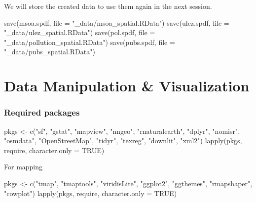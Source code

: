 \documentclass[
  letterpaper,
  DIV=11,
  numbers=noendperiod]{scrreprt}
\newenvironment{Shaded}{\begin{snugshade}}{\end{snugshade}}
\newcommand{\AttributeTok}[1]{\textcolor[rgb]{0.40,0.45,0.13}{#1}}
\newcommand{\ConstantTok}[1]{\textcolor[rgb]{0.56,0.35,0.01}{#1}}
\newcommand{\FunctionTok}[1]{\textcolor[rgb]{0.28,0.35,0.67}{#1}}
\newcommand{\NormalTok}[1]{\textcolor[rgb]{0.00,0.23,0.31}{#1}}
\newcommand{\OtherTok}[1]{\textcolor[rgb]{0.00,0.23,0.31}{#1}}
\newcommand{\StringTok}[1]{\textcolor[rgb]{0.13,0.47,0.30}{#1}}
\begin{document}
We will store the created data to use them again in the next session.

\begin{Shaded}
\begin{Highlighting}[]
\FunctionTok{save}\NormalTok{(msoa.spdf, }\AttributeTok{file =} \StringTok{"\_data/msoa\_spatial.RData"}\NormalTok{)}
\FunctionTok{save}\NormalTok{(ulez.spdf, }\AttributeTok{file =} \StringTok{"\_data/ulez\_spatial.RData"}\NormalTok{)}
\FunctionTok{save}\NormalTok{(pol.spdf, }\AttributeTok{file =} \StringTok{"\_data/pollution\_spatial.RData"}\NormalTok{)}
\FunctionTok{save}\NormalTok{(pubs.spdf, }\AttributeTok{file =} \StringTok{"\_data/pubs\_spatial.RData"}\NormalTok{)}
\end{Highlighting}
\end{Shaded}


\hypertarget{data-manipulation-visualization}{%
\chapter{Data Manipulation \&
Visualization}\label{data-manipulation-visualization}}

\hypertarget{required-packages-1}{%
\subsection*{Required packages}\label{required-packages-1}}

\begin{Shaded}
\begin{Highlighting}[]
\NormalTok{pkgs }\OtherTok{\textless{}{-}} \FunctionTok{c}\NormalTok{(}\StringTok{"sf"}\NormalTok{, }\StringTok{"gstat"}\NormalTok{, }\StringTok{"mapview"}\NormalTok{, }\StringTok{"nngeo"}\NormalTok{, }\StringTok{"rnaturalearth"}\NormalTok{, }\StringTok{"dplyr"}\NormalTok{,}
          \StringTok{"nomisr"}\NormalTok{, }\StringTok{"osmdata"}\NormalTok{, }\StringTok{"OpenStreetMap"}\NormalTok{, }\StringTok{"tidyr"}\NormalTok{, }\StringTok{"texreg"}\NormalTok{, }\StringTok{"downlit"}\NormalTok{, }\StringTok{"xml2"}\NormalTok{) }
\FunctionTok{lapply}\NormalTok{(pkgs, require, }\AttributeTok{character.only =} \ConstantTok{TRUE}\NormalTok{)}
\end{Highlighting}
\end{Shaded}

For mapping

\begin{Shaded}
\begin{Highlighting}[]
\NormalTok{pkgs }\OtherTok{\textless{}{-}} \FunctionTok{c}\NormalTok{(}\StringTok{"tmap"}\NormalTok{, }\StringTok{"tmaptools"}\NormalTok{, }\StringTok{"viridisLite"}\NormalTok{, }
          \StringTok{"ggplot2"}\NormalTok{, }\StringTok{"ggthemes"}\NormalTok{, }\StringTok{"rmapshaper"}\NormalTok{, }\StringTok{"cowplot"}\NormalTok{) }
\FunctionTok{lapply}\NormalTok{(pkgs, require, }\AttributeTok{character.only =} \ConstantTok{TRUE}\NormalTok{)}
\end{Highlighting}
\end{Shaded}
\end{document}
